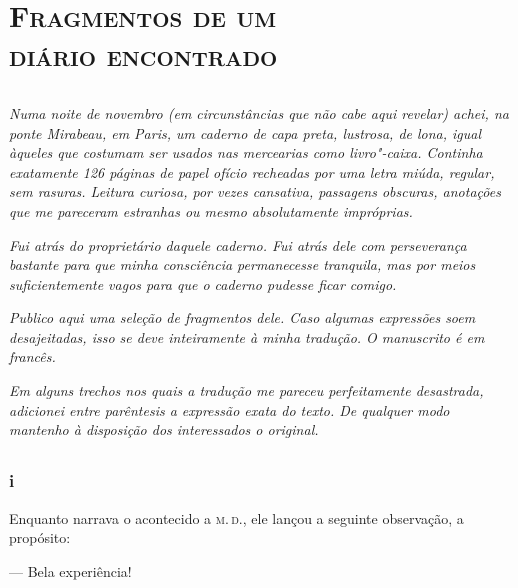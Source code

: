 \part[Fragmentos de um diário\vspace*{-.2cm}\\ encontrado]{\textsc{Fragmentos de um\\ diário encontrado}}

\chapter*{}

\textit{Numa noite de novembro (em circunstâncias que não cabe aqui
revelar) achei, na ponte Mirabeau, em Paris, um caderno de capa preta,
lustrosa, de lona, igual àqueles que costumam ser usados nas
mercearias como livro"-caixa. Continha exatamente 126 páginas de papel
ofício recheadas por uma letra miúda, regular, sem rasuras. Leitura
curiosa, por vezes cansativa, passagens obscuras, anotações que me
pareceram estranhas ou mesmo absolutamente impróprias.}

\textit{Fui atrás do proprietário daquele caderno. Fui atrás dele com
perseverança bastante para que minha consciência permanecesse tranquila,
mas por meios suficientemente vagos para que o caderno pudesse ficar comigo.}

\textit{Publico aqui uma seleção de fragmentos dele. Caso algumas
expressões soem desajeitadas, isso se deve inteiramente à minha
tradução. O manuscrito é em francês.}

\textit{Em alguns trechos nos quais a tradução me pareceu perfeitamente
desastrada, adicionei entre parêntesis a expressão exata do texto. De
qualquer modo mantenho à disposição dos interessados o original.}



\chapter*{}
\section{i} 


\noindent{}Enquanto narrava o acontecido a \textsc{m.\,d.}, ele lançou a seguinte
observação, a propósito:

--- Bela experiência!

